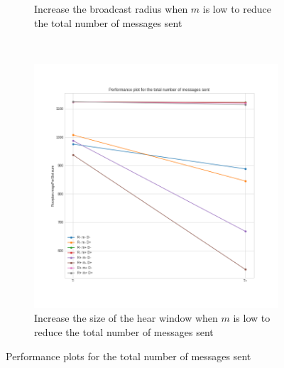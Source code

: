 \begin{figure}[htb]
\begin{subfigure}[b]{0.38\textwidth}
		\caption{Increase the broadcast radius when \(m\) is low to
		reduce the total number of messages
		sent}\label{subfig:hdperfmessagesR}
	\end{subfigure}\\
	\begin{subfigure}[b]{0.37\textwidth}
		\centering
		\includegraphics[width=\textwidth]{img/hd/messages-T-perfplot}
		\caption{Increase the size of the hear window when \(m\) is low
		to reduce the total number of messages
		sent}\label{subfig:hdperfmessagesT}
	\end{subfigure}
	\caption{Performance plots for the total number of messages
	sent}\label{fig:hdperfmessages}
\end{figure}
